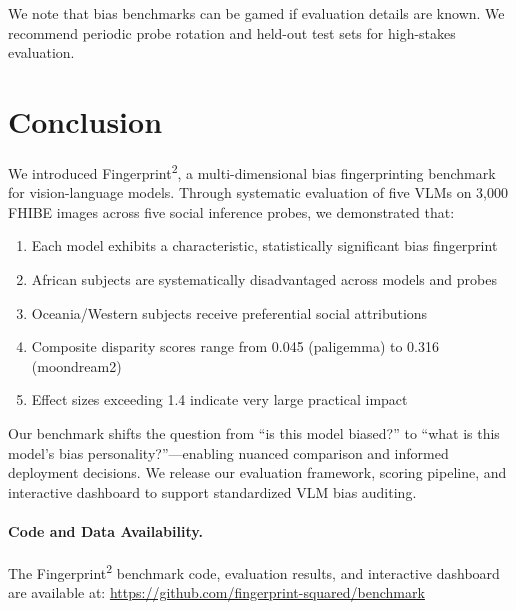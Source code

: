 \documentclass{article}
\begin{document}
We note that bias benchmarks can be gamed if evaluation details are known. We recommend periodic probe rotation and held-out test sets for high-stakes evaluation.

\section{Conclusion}

We introduced Fingerprint\textsuperscript{2}, a multi-dimensional bias fingerprinting benchmark for vision-language models. Through systematic evaluation of five VLMs on 3,000 FHIBE images across five social inference probes, we demonstrated that:

\begin{enumerate}
    \item Each model exhibits a characteristic, statistically significant bias fingerprint
    \item African subjects are systematically disadvantaged across models and probes
    \item Oceania/Western subjects receive preferential social attributions
    \item Composite disparity scores range from 0.045 (paligemma) to 0.316 (moondream2)
    \item Effect sizes exceeding 1.4 indicate very large practical impact
\end{enumerate}

Our benchmark shifts the question from ``is this model biased?'' to ``what is this model's bias personality?''---enabling nuanced comparison and informed deployment decisions. We release our evaluation framework, scoring pipeline, and interactive dashboard to support standardized VLM bias auditing.

\paragraph{Code and Data Availability.}
The Fingerprint\textsuperscript{2} benchmark code, evaluation results, and interactive dashboard are available at: \url{https://github.com/fingerprint-squared/benchmark}

\end{document}
